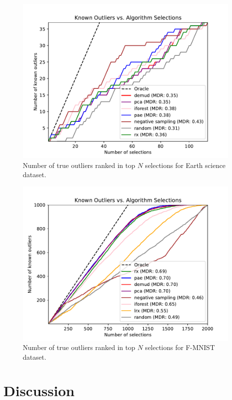 \documentclass[letterpaper]{article} %
\begin{document}
\begin{figure}
    \centering
    \includegraphics[width=\linewidth]{figures/faw_combined_plot.pdf}
    \caption{Number of true outliers ranked in top $N$ selections for 
    Earth science dataset.}
    \label{fig:faw_results}
\end{figure}

\begin{figure}
    \centering
    \includegraphics[width=\linewidth]{figures/fmnist_combined_plot.pdf}
    \caption{Number of true outliers ranked in top $N$ selections for 
    F-MNIST dataset.}
    \label{fig:fmnist_results}
\end{figure}

\section{Discussion}
\end{document}
